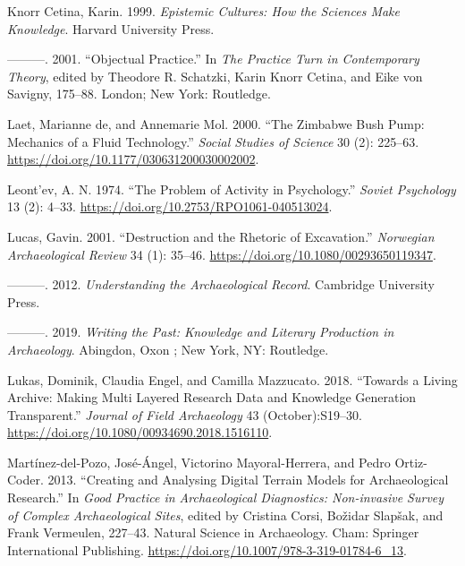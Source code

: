 \documentclass[
]{article}
\newlength{\cslhangindent}
\newenvironment{CSLReferences}[2] %
 {\begin{list}{}{%
  \setlength{\itemindent}{0pt}
  \setlength{\leftmargin}{0pt}
  \setlength{\parsep}{0pt}
  \ifodd #1
   \setlength{\leftmargin}{\cslhangindent}
   \setlength{\itemindent}{-1\cslhangindent}
  \fi
  \setlength{\itemsep}{#2\baselineskip}}}
 {\end{list}}
\begin{document}
\begin{CSLReferences}{1}{0}
Knorr Cetina, Karin. 1999. \emph{Epistemic {Cultures}: {How} the
{Sciences Make Knowledge}}. Harvard University Press.

---------. 2001. {``Objectual Practice.''} In \emph{The {Practice Turn}
in {Contemporary Theory}}, edited by Theodore R. Schatzki, Karin Knorr
Cetina, and Eike von Savigny, 175--88. London; New York: Routledge.

Laet, Marianne de, and Annemarie Mol. 2000. {``The {Zimbabwe Bush Pump}:
{Mechanics} of a {Fluid Technology}.''} \emph{Social Studies of Science}
30 (2): 225--63. \url{https://doi.org/10.1177/030631200030002002}.

Leont'ev, A. N. 1974. {``The {Problem} of {Activity} in {Psychology}.''}
\emph{Soviet Psychology} 13 (2): 4--33.
\url{https://doi.org/10.2753/RPO1061-040513024}.

Lucas, Gavin. 2001. {``Destruction and the {Rhetoric} of
{Excavation}.''} \emph{Norwegian Archaeological Review} 34 (1): 35--46.
\url{https://doi.org/10.1080/00293650119347}.

---------. 2012. \emph{Understanding the {Archaeological Record}}.
Cambridge University Press.

---------. 2019. \emph{Writing the Past: {Knowledge} and Literary
Production in Archaeology}. Abingdon, Oxon ; New York, NY: Routledge.

Lukas, Dominik, Claudia Engel, and Camilla Mazzucato. 2018. {``Towards a
{Living Archive}: {Making Multi Layered Research Data} and {Knowledge
Generation Transparent}.''} \emph{Journal of Field Archaeology} 43
(October):S19--30. \url{https://doi.org/10.1080/00934690.2018.1516110}.

Martínez-del-Pozo, José-Ángel, Victorino Mayoral-Herrera, and Pedro
Ortiz-Coder. 2013. {``Creating and {Analysing Digital Terrain Models}
for {Archaeological Research}.''} In \emph{Good {Practice} in
{Archaeological Diagnostics}: {Non-invasive Survey} of {Complex
Archaeological Sites}}, edited by Cristina Corsi, Božidar Slapšak, and
Frank Vermeulen, 227--43. Natural {Science} in {Archaeology}. Cham:
Springer International Publishing.
\url{https://doi.org/10.1007/978-3-319-01784-6_13}.


\end{CSLReferences}
\end{document}
